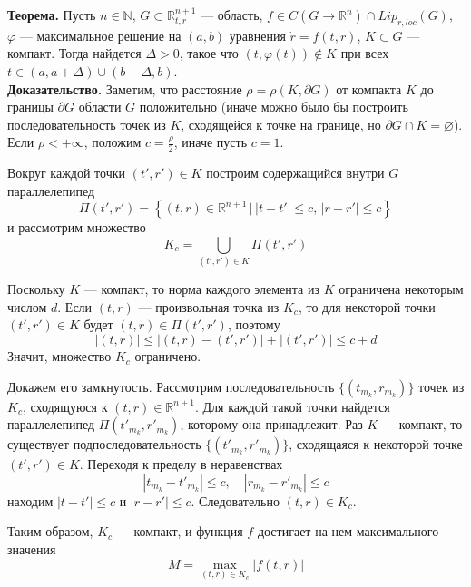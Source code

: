 \textbf{Теорема.} Пусть $n \in \mathbb{N}$, $G \subset \mathbb{R}_{t,r}^{n+1}$ --- область, $f \in C(G \to \mathbb{R}^n)\cap Lip_{r,loc}(G)$, $\varphi$ --- максимальное решение на $(a,b)$ уравнения $\dot{r} = f(t,r)$, $K \subset G$ --- компакт. Тогда найдется $\Delta > 0$, такое что $(t, \varphi(t)) \notin K$ при всех $t \in (a, a + \Delta) \cup (b - \Delta, b)$.\\

\noindent \textbf{Доказательство.} Заметим, что расстояние $\rho = \rho(K, \partial G)$ от компакта $K$ до границы $\partial G$ области $G$ положительно (иначе можно было бы построить последовательность точек из $K$, сходящейся к точке на границе, но $\partial G \cap K = \varnothing$). Если $\rho < +\infty$, положим $c = \frac{\rho}{2}$, иначе пусть $c = 1$.

Вокруг каждой точки $(t', r') \in K$ построим содержащийся внутри $G$ параллелепипед
\begin{equation*}
    \Pi(t',r') = \left\{(t,r) \in \mathbb{R}^{n+1}\, | \, |t-t'| \le c,\, |r - r'| \le c \right\}
\end{equation*}
и рассмотрим множество
\begin{equation*}
    K_c = \bigcup_{(t',r') \in K} \Pi(t',r')
\end{equation*}

Поскольку $K$ --- компакт, то норма каждого элемента из $K$ ограничена некоторым числом $d$. Если $(t,r)$ --- произвольная точка из $K_c$, то для некоторой точки $(t',r') \in K$ будет $(t,r) \in \Pi(t',r')$, поэтому
\begin{equation*}
    |(t,r)| \le |(t,r) - (t',r')| + |(t',r')| \le c + d
\end{equation*}
Значит, множество $K_c$ ограничено.

Докажем его замкнутость. Рассмотрим последовательность $\{(t_{m_k}, r_{m_k})\}$ точек из $K_c$, сходящуюся к $(t,r) \in \mathbb{R}^{n+1}$. Для каждой такой точки найдется параллелепипед $\Pi(t'_{m_k},r'_{m_k})$, которому она принадлежит. Раз $K$ --- компакт, то существует подпоследовательность $\{(t'_{m_k}, r'_{m_k})\}$, сходящаяся к некоторой точке $(t',r') \in K$. Переходя к пределу в неравенствах
\begin{equation*}
    |t_{m_k} - t'_{m_k}| \le c, \quad |r_{m_k} - r'_{m_k}| \le c
\end{equation*}
находим $|t - t'| \le c$ и $|r - r'| \le c$. Следовательно $(t,r) \in K_c$.

Таким образом, $K_c$ --- компакт, и функция $f$ достигает на нем максимального значения
\begin{equation*}
    M = \max_{(t,r) \in K_c} |f(t,r)|
\end{equation*}

